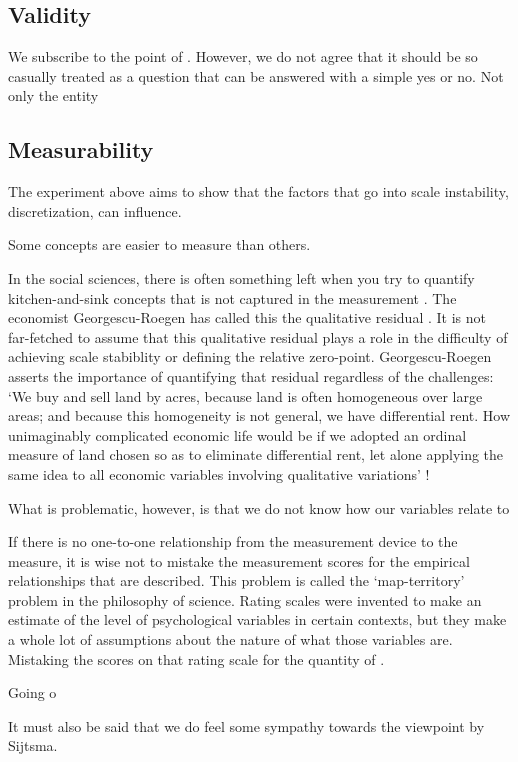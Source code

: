 \documentclass[utf8]{FrontiersinVancouver}
\begin{document}
\subsection{Validity}
We subscribe to the point of . However, we do not agree that it should be so casually treated as a question that can be answered with a simple yes or no. Not only the entity 

\subsection{Measurability}
The experiment above aims to show that the factors that go into scale instability, discretization, can influence. 

Some concepts are easier to measure than others. 

In the social sciences, there is often something left when you try to quantify kitchen-and-sink concepts that is not captured in the measurement \citep{}. The economist Georgescu-Roegen has called this the qualitative residual \citep{georgescu-roegenMeasureQualityOptimum1965}. It is not far-fetched to assume that this qualitative residual plays a role in the difficulty of achieving scale stabiblity or defining the relative zero-point. Georgescu-Roegen asserts the importance of quantifying that residual regardless of the challenges: `We buy and sell land by acres, because land is often homogeneous over large areas; and because this homogeneity is not general, we have differential rent. How unimaginably complicated economic life would be if we adopted an ordinal measure of land chosen so as to eliminate differential rent, let alone applying the same idea to all economic variables involving qualitative variations' \citep{georgescu-roegenMeasureQualityOptimum1965}!


What is problematic, however, is that we do not know how our variables relate to 


If there is no one-to-one relationship from the measurement device to the measure, it is wise not to mistake the measurement scores for the empirical relationships that are described. This problem is called the `map-territory' problem in the philosophy of science. Rating scales were invented to make an estimate of the level of psychological variables in certain contexts, but they make a whole lot of assumptions about the nature of what those variables are. Mistaking the scores on that rating scale for the quantity of . 

Going o

It must also be said that we do feel some sympathy towards the viewpoint by Sijtsma\citep{sijtsmaPsychologicalMeasurementPhysics2012}. 
\end{document}
